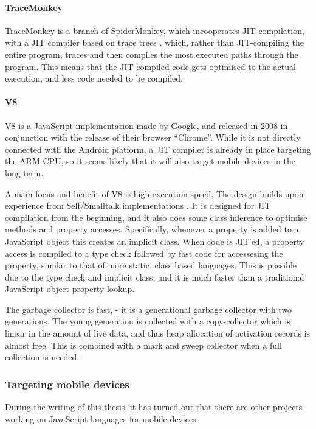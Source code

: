 \documentclass[11pt]{report}
\begin{document}
\paragraph{TraceMonkey} 
TraceMonkey is a branch of SpiderMonkey, which incooperates JIT compilation, with a JIT compiler based on trace trees \cite{trace-tree}, 
which, rather than JIT-compiling the entire program,
traces and then compiles the most executed paths through the program.
This means that the JIT compiled code gets optimised to the actual execution,
and less code needed to be compiled.

\paragraph{V8} V8 \cite{v8} is a JavaScript implementation made by Google, and released in 2008 in conjunction with the release of their browser ``Chrome''. 
While it is not directly connected with the Android platform, a JIT compiler is already in place targeting the ARM CPU, so it seems likely that it will also target mobile devices in the long term.

A main focus and benefit of V8 is high execution speed.
The design builds upon experience from Self/Smalltalk implementations \cite{articles-before-v8}.
It is designed for JIT compilation from the beginning, and it also does some class inference to optimise methods and property accesses.
Specifically, whenever a property is added to a JavaScript object this creates an implicit class. When code is JIT'ed, a property access is compiled to a type check followed by fast code for accessesing the property, similar to that of more static, class based languages. This is possible due to the type check and implicit class, and it is much faster than a traditional JavaScript object property lookup.

The garbage collector is fast, - it is a generational garbage collector with two generations. The young generation is collected with a copy-collector which is linear in the amount of live data, and thus heap allocation of activation records is almost free. 
This is combined with a mark and sweep collector when a full collection is needed.

\subsubsection{Targeting mobile devices}

During the writing of this thesis, it has turned out that there are other projects working on JavaScript languages for mobile devices.
\end{document}
